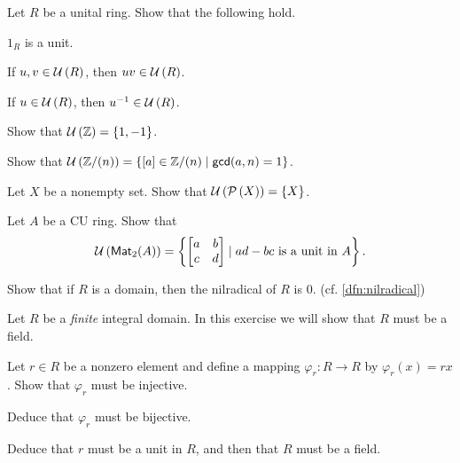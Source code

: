 \begin{exercise} \label{exerc:units-form-group}
Let \(R\) be a unital ring.
Show that the following hold.
\begin{proplist*}
\item \(1_R\) is a unit.
\item If \(u, v \in  \mathcal{U}\left(R\right) \), then \(uv \in  \mathcal{U}\left(R\right) \).
\item If \(u \in  \mathcal{U}\left(R\right) \), then \(u^{-1} \in  \mathcal{U}\left(R\right) \).
\end{proplist*}
\end{exercise}

\begin{exercise}
Show that \( \mathcal{U}\left(\mathbb{Z}\right)  = \{ 1, -1 \}\).
\end{exercise}

\begin{exercise}
Show that \( \mathcal{U}\left(\mathbb{Z}/(n)\right)  = \{ [a] \in \mathbb{Z}/(n) \mid \mathsf{gcd}(a, n) = 1 \}\).
\end{exercise}

\begin{exercise}
Let \(X\) be a nonempty set.
Show that \( \mathcal{U}\left(\mathcal{P}\left(X\right)\right)  = \{X\}\).
\end{exercise}

\begin{exercise}
Let \(A\) be a CU ring.
Show that \[  \mathcal{U}\left(\mathsf{Mat}_{2}(A)\right)  = \left\{ \begin{bmatrix} a & b \\ c & d \end{bmatrix} \mid ad - bc\ \mathrm{is\ a\ unit\ in}\ A \right\}. \]
\end{exercise}

\begin{exercise}
Show that if \(R\) is a domain, then the nilradical of \(R\) is \(0\).
(cf. \autoref{dfn:nilradical})
\end{exercise}

\begin{exercise}
Let \(R\) be a \emph{finite} integral domain.
In this exercise we will show that \(R\) must be a field.
\begin{proplist}
\item Let \(r \in R\) be a nonzero element and define a mapping \(\varphi_r : R \rightarrow R\) by \(\varphi_r(x) = rx\).
Show that \(\varphi_r\) must be injective.
\item Deduce that \(\varphi_r\) must be bijective.
\item Deduce that \(r\) must be a unit in \(R\), and then that \(R\) must be a field.
\end{proplist}
\end{exercise}

